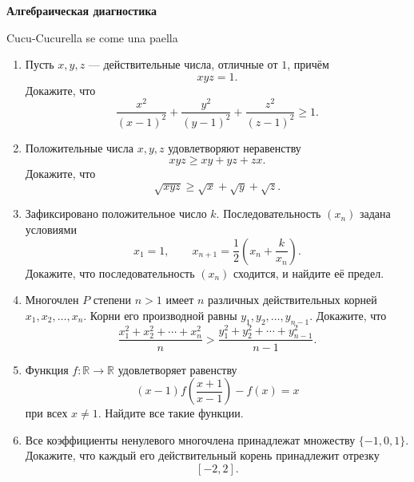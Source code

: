 \centerline{\bf \Huge Алгебраическая диагностика}

\begin{flushright}
        \scriptsize{Cucu-Cucurella se come una paella}
\end{flushright}

\begin{enumerate}

\item Пусть $x,y,z$ — действительные числа, отличные от $1$, причём
\[
    xyz=1.
\]
Докажите, что
\[
    \frac{x^2}{(x-1)^2}
    +\frac{y^2}{(y-1)^2}
    +\frac{z^2}{(z-1)^2}
    \geqslant 1.
\]

\item Положительные числа $x,y,z$ удовлетворяют неравенству
\[
    xyz\geqslant xy+yz+zx.
\]
Докажите, что
\[
    \sqrt{xyz}\geqslant \sqrt{x}+\sqrt{y}+\sqrt{z}.
\]

\item Зафиксировано положительное число $k$. Последовательность
$(x_n)$ задана условиями
\[
    x_1=1,
    \qquad
    x_{n+1}=\frac12\left(x_n+\frac{k}{x_n}\right).
\]
Докажите, что последовательность $(x_n)$ сходится, и найдите её
предел.

\item Многочлен $P$ степени $n>1$ имеет $n$ различных действительных
корней $x_1,x_2,\ldots,x_n$. Корни его производной равны
$y_1,y_2,\ldots,y_{n-1}$. Докажите, что
\[
    \frac{x_1^2+x_2^2+\cdots+x_n^2}{n}
    >
    \frac{y_1^2+y_2^2+\cdots+y_{n-1}^2}{n-1}.
\]

\item Функция $f\colon\mathbb R\to\mathbb R$ удовлетворяет равенству
\[
    (x-1)f\left(\frac{x+1}{x-1}\right)-f(x)=x
\]
при всех $x\ne 1$. Найдите все такие функции.

\item Все коэффициенты ненулевого многочлена принадлежат множеству
$\{-1,0,1\}$. Докажите, что каждый его действительный корень
принадлежит отрезку
\[
    [-2,2].
\]


\end{enumerate}

